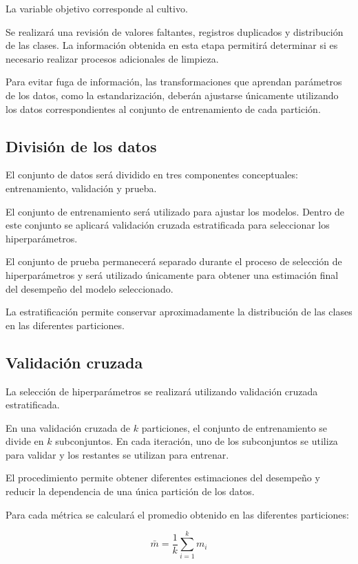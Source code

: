 \documentclass[conference]{IEEEtran}
\begin{document}
La variable objetivo corresponde al cultivo.

Se realizará una revisión de valores faltantes, registros duplicados y distribución de las clases. La información obtenida en esta etapa permitirá determinar si es necesario realizar procesos adicionales de limpieza.

Para evitar fuga de información, las transformaciones que aprendan parámetros de los datos, como la estandarización, deberán ajustarse únicamente utilizando los datos correspondientes al conjunto de entrenamiento de cada partición.


\subsection{División de los datos}

El conjunto de datos será dividido en tres componentes conceptuales: entrenamiento, validación y prueba.

El conjunto de entrenamiento será utilizado para ajustar los modelos. Dentro de este conjunto se aplicará validación cruzada estratificada para seleccionar los hiperparámetros.

El conjunto de prueba permanecerá separado durante el proceso de selección de hiperparámetros y será utilizado únicamente para obtener una estimación final del desempeño del modelo seleccionado.

La estratificación permite conservar aproximadamente la distribución de las clases en las diferentes particiones.


\subsection{Validación cruzada}

La selección de hiperparámetros se realizará utilizando validación cruzada estratificada.

En una validación cruzada de $k$ particiones, el conjunto de entrenamiento se divide en $k$ subconjuntos. En cada iteración, uno de los subconjuntos se utiliza para validar y los restantes se utilizan para entrenar.

El procedimiento permite obtener diferentes estimaciones del desempeño y reducir la dependencia de una única partición de los datos.

Para cada métrica se calculará el promedio obtenido en las diferentes particiones:

\begin{equation}
\bar{m}=\frac{1}{k}\sum_{i=1}^{k}m_i
\end{equation}
\end{document}
